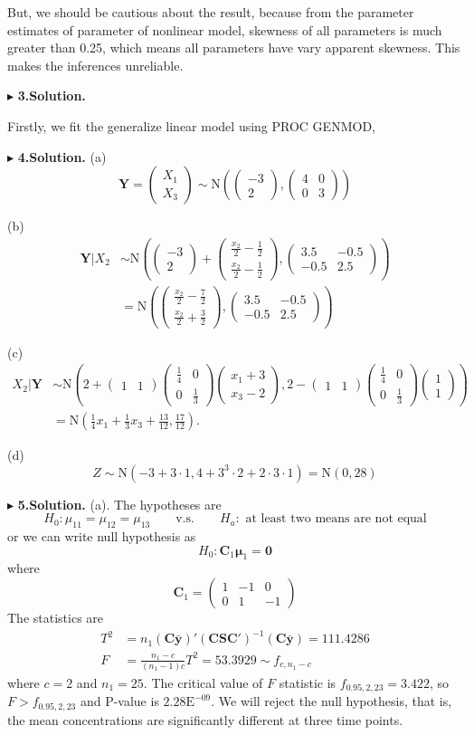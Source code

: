 \documentclass[letterpaper, 12pt]{article}
\newcommand{\ba}{$$\begin{aligned}}
\newcommand{\ea}{\end{aligned}$$}
\newcommand{\lma}{\left(\begin{matrix}}
\newcommand{\rma}{\end{matrix}\right)}
\begin{document}
But, we should be cautious about the result, because from the parameter estimates of parameter of nonlinear model, skewness of all parameters is much greater than 0.25, which means all parameters have vary apparent skewness. This makes the inferences unreliable.


$\blacktriangleright$ \textbf{3.\quad Solution.} 

Firstly, we fit the generalize linear model using PROC GENMOD,




$\blacktriangleright$ \textbf{4.\quad Solution.} 
(a) 
$$
\bm{Y}=\lma X_1\\X_3\rma\sim \text{N}\left(\lma -3 \\2\rma,\lma 4&0\\0&3\rma\right)
$$

(b)
\ba
\bm{Y}|X_2&\sim\text{N}\left(\lma -3\\2\rma+\lma \frac{x_2}{2}-\frac12\\\frac{x_2}2-\frac12\rma,\lma 3.5 &-0.5\\-0.5 &2.5\rma\right)\\
&=\text{N}\left(\lma \frac{x_2}{2}-\frac72\\\frac{x_2}2+\frac32\rma,\lma 3.5 &-0.5\\-0.5 &2.5\rma\right)
\ea


(c)
\ba
X_2|\bm{Y}&\sim\text{N}\left(2+\lma 1&1\rma\lma \frac14&0\\0&\frac13\rma\lma x_1+3\\x_3-2\rma, 2-\lma 1&1\rma\lma \frac14&0\\0&\frac13\rma\lma1\\1\rma\right)\\
&=\text{N}\left(\frac14x_1+\frac13x_3+\frac{13}{12},\frac{17}{12}\right).
\ea

(d) 
$$
Z\sim\text{N}(-3+3\cdot1,4+3^3\cdot2+2\cdot3\cdot1)=\text{N}(0,28)
$$

$\blacktriangleright$ \textbf{5.\quad Solution.}
(a). The hypotheses are
$$
H_0:\mu_{11}=\mu_{12}=\mu_{13}\qquad\text{v.s.}\qquad H_a: \text{ at least two means are not equal}
$$
or we can write null hypothesis as
$$
H_0: \bm{C}_1\bm{\mu}_1=\bm{0}
$$
where
$$
\bm{C}_1=\lma 1 &-1 &0\\ 0 &1 &-1\rma
$$
The statistics are
\ba
T^2&=n_1(\bm{C\bar{y}})'(\bm{CSC}')^{-1}(\bm{C\bar{y}})=111.4286\\
F&=\frac{n_1-c}{(n_1-1)c}T^2=53.3929\sim f_{c,n_1-c}
\ea
where $c=2$ and $n_1=25$. The critical value of $F$ statistic is $f_{0.95,2,23}=3.422$, so $F>f_{0.95,2,23}$ and P-value is $2.28\text{E}^{-09}$. We will reject the  null hypothesis, that is, the mean concentrations are significantly different at three time points.
\end{document}
